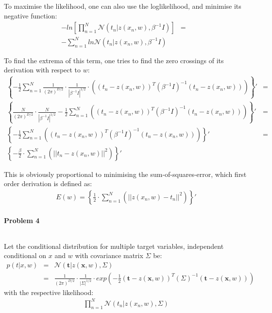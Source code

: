 \documentclass{article}
\renewcommand{\Vec}[1]{\ensuremath{\mathbf{#1}}}
\begin{document}
To maximise the likelihood, one can also use the loglikelihood, and minimise its negative function:
\begin{eqnarray}
-ln\left[ \prod_{n=1}^N\mathcal{N}(t_n | z(x_n,w), \beta^{-1}I) \right] &=&\\
-\sum_{n=1}^N ln\mathcal{N}(t_n | z(x_n,w), \beta^{-1}I)
\end{eqnarray}

To find the extrema of this term, one tries to find the zero crossings of its derivation with respect to $w$:
\begin{eqnarray}
\left\{ -\frac{1}{2}\sum_{n=1}^N \frac{1}{(2\pi)^{D/2}}\cdot \frac{1}{|\beta^{-1}I |^{1/2}}\cdot \left( (t_n-z(x_n,w))^T(\beta^{-1}I)^{-1}(t_n-z(x_n,w))\right)\right\}' &=& \\
\left\{ \frac{N}{(2\pi)^{D/2}}\cdot \frac{N}{|\beta^{-1}I |^{1/2}} -\frac{1}{2}\sum_{n=1}^N \left( (t_n-z(x_n,w))^T(\beta^{-1}I)^{-1}(t_n-z(x_n,w))\right)\right\}' &=& \\
\left\{ -\frac{1}{2} \sum_{n=1}^N \left((t_n-z(x_n,w))^T(\beta^{-1}I)^{-1}(t_n-z(x_n,w))\right)\right\}' &=& \\
\left\{ -\frac{\beta}{2} \cdot \sum_{n=1}^N \left( ||t_n-z(x_n,w)||^2 \right) \right\}'
\end{eqnarray}

This is obviously proportional to minimising the sum-of-squares-error, which first order derivation is defined as:
\begin{eqnarray}
E(w) = \left\{ \frac{1}{2} \cdot \sum_{n=1}^N \left( ||z(x_n,w)-t_n||^2 \right) \right\}'
\end{eqnarray}

\paragraph*{Problem 4}
$\;$ 

Let the conditional distribution for multiple target variables, independent conditional on $x$ and $w$ with covariance matrix $\Sigma$ be:
\begin{eqnarray}
p(t | x,w) &=& \mathcal{N}(\Vec{t} | z(\Vec{x},w), \Sigma)\\
&=& \frac{1}{(2\pi)^{D/2}}\cdot \frac{1}{|\Sigma |^{1/2}}\cdot exp \left( -\frac{1}{2} (\Vec{t}-z(\Vec{x},w))^T(\Sigma)^{-1}(\Vec{t}-z(\Vec{x},w))\right)
\end{eqnarray}
with the respective likelihood:
\begin{eqnarray}
\prod_{n=1}^N\mathcal{N}(t_n | z(x_n,w), \Sigma)
\end{eqnarray}
\end{document}
